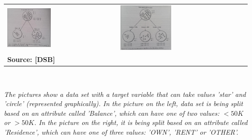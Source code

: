     \begin{tabular}{p{}p{}}
    \includegraphics[width=0.41\textwidth]{ig_ex1_pic.jpg} & \includegraphics[width=0.41\textwidth]{ig_ex2_pic.jpg} \\  [-1.5ex]
      {\fontsize{10}{0}\selectfont \textbf{Source: [DSB]}} & \\
    \end{tabular} \\
    \begin{spacing}{0.7}\small \emph{The pictures show a data set with a target variable that can take values 'star' and 'circle' (represented graphically). In the picture on the left, data set is being split based on an attribute called 'Balance', which can have one of two values: $<50K$ or $>50K$. In the picture on the right, it is being split based on an attribute called 'Residence', which can have one of three values: 'OWN', 'RENT' or 'OTHER'.}\end{spacing}
    \newpage
